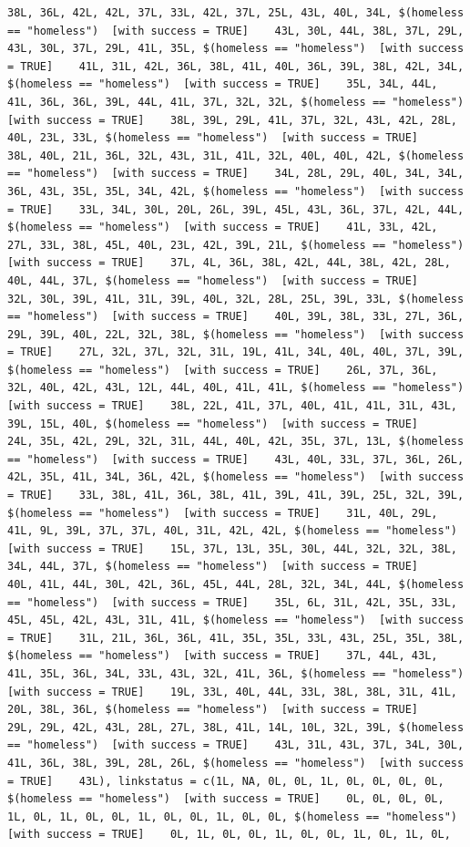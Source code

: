 \documentclass{tufte-book}\usepackage[]{graphicx}\usepackage[]{xcolor}
\makeatletter
\newenvironment{kframe}{%
 \def\at@end@of@kframe{}%
 \ifinner\ifhmode%
  \def\at@end@of@kframe{\end{minipage}}%
  \begin{minipage}{\columnwidth}%
 \fi\fi%
 \def\FrameCommand##1{\hskip\@totalleftmargin \hskip-\fboxsep
 \colorbox{shadecolor}{##1}\hskip-\fboxsep
     \hskip-\linewidth \hskip-\@totalleftmargin \hskip\columnwidth}%
 \MakeFramed {\advance\hsize-\width
   \@totalleftmargin\z@ \linewidth\hsize
   \@setminipage}}%
 {\par\unskip\endMakeFramed%
 \at@end@of@kframe}
\newenvironment{knitrout}{}{} %
\makeatother
\begin{document}
\begin{knitrout}
\begin{kframe}
\begin{verbatim}
38L, 36L, 42L, 42L, 37L, 33L, 42L, 37L, 25L, 43L, 40L, 34L, $(homeless == "homeless")  [with success = TRUE]    43L, 30L, 44L, 38L, 37L, 29L, 43L, 30L, 37L, 29L, 41L, 35L, $(homeless == "homeless")  [with success = TRUE]    41L, 31L, 42L, 36L, 38L, 41L, 40L, 36L, 39L, 38L, 42L, 34L, $(homeless == "homeless")  [with success = TRUE]    35L, 34L, 44L, 41L, 36L, 36L, 39L, 44L, 41L, 37L, 32L, 32L, $(homeless == "homeless")  [with success = TRUE]    38L, 39L, 29L, 41L, 37L, 32L, 43L, 42L, 28L, 40L, 23L, 33L, $(homeless == "homeless")  [with success = TRUE]    38L, 40L, 21L, 36L, 32L, 43L, 31L, 41L, 32L, 40L, 40L, 42L, $(homeless == "homeless")  [with success = TRUE]    34L, 28L, 29L, 40L, 34L, 34L, 36L, 43L, 35L, 35L, 34L, 42L, $(homeless == "homeless")  [with success = TRUE]    33L, 34L, 30L, 20L, 26L, 39L, 45L, 43L, 36L, 37L, 42L, 44L, $(homeless == "homeless")  [with success = TRUE]    41L, 33L, 42L, 27L, 33L, 38L, 45L, 40L, 23L, 42L, 39L, 21L, $(homeless == "homeless")  [with success = TRUE]    37L, 4L, 36L, 38L, 42L, 44L, 38L, 42L, 28L, 40L, 44L, 37L, $(homeless == "homeless")  [with success = TRUE]    32L, 30L, 39L, 41L, 31L, 39L, 40L, 32L, 28L, 25L, 39L, 33L, $(homeless == "homeless")  [with success = TRUE]    40L, 39L, 38L, 33L, 27L, 36L, 29L, 39L, 40L, 22L, 32L, 38L, $(homeless == "homeless")  [with success = TRUE]    27L, 32L, 37L, 32L, 31L, 19L, 41L, 34L, 40L, 40L, 37L, 39L, $(homeless == "homeless")  [with success = TRUE]    26L, 37L, 36L, 32L, 40L, 42L, 43L, 12L, 44L, 40L, 41L, 41L, $(homeless == "homeless")  [with success = TRUE]    38L, 22L, 41L, 37L, 40L, 41L, 41L, 31L, 43L, 39L, 15L, 40L, $(homeless == "homeless")  [with success = TRUE]    24L, 35L, 42L, 29L, 32L, 31L, 44L, 40L, 42L, 35L, 37L, 13L, $(homeless == "homeless")  [with success = TRUE]    43L, 40L, 33L, 37L, 36L, 26L, 42L, 35L, 41L, 34L, 36L, 42L, $(homeless == "homeless")  [with success = TRUE]    33L, 38L, 41L, 36L, 38L, 41L, 39L, 41L, 39L, 25L, 32L, 39L, $(homeless == "homeless")  [with success = TRUE]    31L, 40L, 29L, 41L, 9L, 39L, 37L, 37L, 40L, 31L, 42L, 42L, $(homeless == "homeless")  [with success = TRUE]    15L, 37L, 13L, 35L, 30L, 44L, 32L, 32L, 38L, 34L, 44L, 37L, $(homeless == "homeless")  [with success = TRUE]    40L, 41L, 44L, 30L, 42L, 36L, 45L, 44L, 28L, 32L, 34L, 44L, $(homeless == "homeless")  [with success = TRUE]    35L, 6L, 31L, 42L, 35L, 33L, 45L, 45L, 42L, 43L, 31L, 41L, $(homeless == "homeless")  [with success = TRUE]    31L, 21L, 36L, 36L, 41L, 35L, 35L, 33L, 43L, 25L, 35L, 38L, $(homeless == "homeless")  [with success = TRUE]    37L, 44L, 43L, 41L, 35L, 36L, 34L, 33L, 43L, 32L, 41L, 36L, $(homeless == "homeless")  [with success = TRUE]    19L, 33L, 40L, 44L, 33L, 38L, 38L, 31L, 41L, 20L, 38L, 36L, $(homeless == "homeless")  [with success = TRUE]    29L, 29L, 42L, 43L, 28L, 27L, 38L, 41L, 14L, 10L, 32L, 39L, $(homeless == "homeless")  [with success = TRUE]    43L, 31L, 43L, 37L, 34L, 30L, 41L, 36L, 38L, 39L, 28L, 26L, $(homeless == "homeless")  [with success = TRUE]    43L), linkstatus = c(1L, NA, 0L, 0L, 1L, 0L, 0L, 0L, 0L, $(homeless == "homeless")  [with success = TRUE]    0L, 0L, 0L, 0L, 1L, 0L, 1L, 0L, 0L, 1L, 0L, 0L, 1L, 0L, 0L, $(homeless == "homeless")  [with success = TRUE]    0L, 1L, 0L, 0L, 1L, 0L, 0L, 1L, 0L, 1L, 0L, 
\end{verbatim}
\end{kframe}
\end{knitrout}
\end{document}
